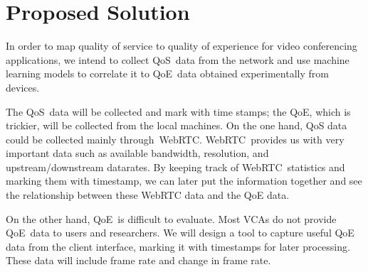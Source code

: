 \section{Proposed Solution}\label{proposed-solution}
    In order to map quality of service to quality of experience for video conferencing applications, we intend to collect QoS~data from the network and use machine learning models to correlate it to QoE~data obtained experimentally from devices.

    The QoS~data will be collected and mark with time stamps; the QoE, which is trickier, will be collected from the local machines. On the one hand, QoS data could be collected mainly through~WebRTC. WebRTC~provides us with very important data such as available bandwidth, resolution, and upstream/downstream datarates. By keeping track of WebRTC~statistics and marking them with timestamp, we can later put the information together and see the relationship between these WebRTC data and the QoE data.

    On the other hand, QoE~is difficult to evaluate. Most VCAs do not provide QoE~data to users and researchers. We will design a tool to capture useful QoE data from the client interface, marking it with timestamps for later processing. These data will include frame rate and change in frame rate.
